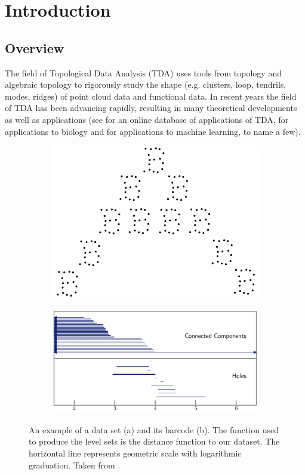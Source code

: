 \chapter{Introduction}\label{chap:introduction}
\section{Overview}
The field of Topological Data Analysis (TDA) uses tools from topology and algebraic topology to rigorously study the shape (e.g. clusters, loop, tendrils, modes, ridges) of point cloud data and functional data.
In recent years the field of TDA has been advancing rapidly, resulting in many theoretical developments as well as applications (see \cite{giuntiLazovskis} for an online database of applications of TDA, \cite{rabadanBlumberg_2019} for applications to biology and \cite{hensel_2021} for applications to machine learning, to name a few).
\begin{figure}[h]
  \centering
  \begin{subfigure}{0.7\textwidth}
    \centering
    \includegraphics[width=0.5\linewidth]{./figures/exampel-dataset.png}
    \caption{}
  \end{subfigure}
  \begin{subfigure}{0.7\textwidth}
    \centering
    \includegraphics[width=0.7\linewidth]{./figures/example-barcode.png}
    \caption{}
  \end{subfigure}
  \caption{An example of a data set (a) and its barcode (b). The function used to produce the level sets is the distance function to our dataset. The horizontal line represents geometric scale with logarithmic graduation. Taken from \cite{oudot_2015}.}
  \label{fig:barcode-example}
\end{figure}

